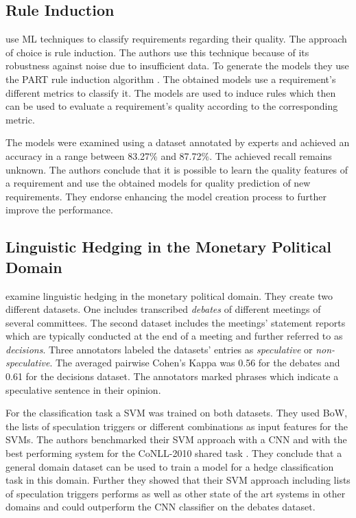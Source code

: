 \subsection{Rule Induction}
\textcite{Parra:2015} use \ac{ML} techniques to classify requirements regarding their quality.
The approach of choice is rule induction.
The authors use this technique because of its robustness against noise due to insufficient data.
To generate the models they use the PART rule induction algorithm \parencite{Eibe:1998}.
The obtained models use a requirement's different metrics to classify it.
The models are used to induce rules which then can be used to evaluate a requirement's quality according to the corresponding metric.

The models were examined using a dataset annotated by experts and achieved an accuracy in a range between 83.27\% and 87.72\%.
The achieved recall remains unknown.
The authors conclude that it is possible to learn the quality features of a requirement and use the obtained models for quality prediction of new requirements.
They endorse enhancing the model creation process to further improve the performance.

\subsection{Linguistic Hedging in the Monetary Political Domain}
\textcite{Stajner:2017} examine linguistic hedging in the monetary political domain.
They create two different datasets.
One includes transcribed \textit{debates} of different meetings of several committees.
The second dataset includes the meetings' statement reports which are typically conducted at the end of a meeting and further referred to as \textit{decisions}.
Three annotators labeled the datasets' entries as \textit{speculative} or \textit{non-speculative}.
The averaged pairwise Cohen's Kappa \parencite{Cohen:1960} was 0.56 for the debates and 0.61 for the decisions dataset.
The annotators marked phrases which indicate a speculative sentence in their opinion.

For the classification task a \ac{SVM} was trained on both datasets.
They used \ac{BoW}, the lists of speculation triggers or different combinations as input features for the \acp{SVM}.
The authors benchmarked their \ac{SVM} approach with a \ac{CNN} and with the best performing system for the CoNLL-2010 shared task \parencite{Farkas:2010}.
They conclude that a general domain dataset can be used to train a model for a hedge classification task in this domain.
Further they showed that their \ac{SVM} approach including lists of speculation triggers performs as well as other state of the art systems in other domains and could outperform the \ac{CNN} classifier on the debates dataset.

